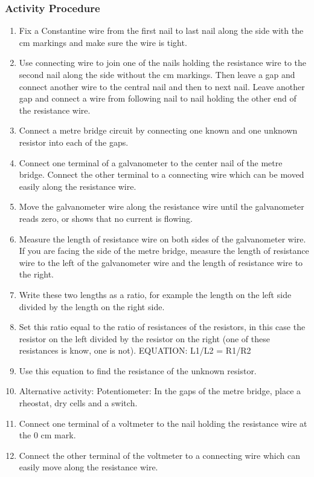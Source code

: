 \subsubsection*{Activity Procedure}
\begin{enumerate}
\item{Fix a Constantine wire from the first nail to last nail along the side with the cm markings and make sure the wire is tight.} 
\item{Use connecting wire to join one of the nails holding the resistance wire to the second nail along the side without the cm markings. Then leave a gap and connect another wire to the central nail and then to next nail. Leave another gap and connect a wire from following nail to nail holding the other end of the resistance wire.} 
\item{Connect a metre bridge circuit by connecting one known and one unknown resistor into each of the gaps.} 
\item{Connect one terminal of a galvanometer to the center nail of the metre bridge. Connect the other terminal to a connecting wire which can be moved easily along the resistance wire.} 
\item{Move the galvanometer wire along the resistance wire until the galvanometer reads zero, or shows that no current is flowing.} 
\item{Measure the length of resistance wire on both sides of the galvanometer wire. If you are facing the side of the metre bridge, measure the length of resistance wire to the left of the galvanometer wire and the length of resistance wire to the right.} 
\item{Write these two lengths as a ratio, for example the length on the left side divided by the length on the right side.} 
\item{Set this ratio equal to the ratio of resistances of the resistors, in this case the resistor on the left divided by the resistor on the right (one of these resistances is know, one is not). EQUATION: L1/L2 = R1/R2} 
\item{Use this equation to find the resistance of the unknown resistor.} 
\item{Alternative activity: Potentiometer: In the gaps of the metre bridge, place a rheostat, dry cells and a switch.} 
\item{Connect one terminal of a voltmeter to the nail holding the resistance wire at the 0 cm mark.} 
\item{Connect the other terminal of the voltmeter to a connecting wire which can easily move along the resistance wire.} 

\end{enumerate}

